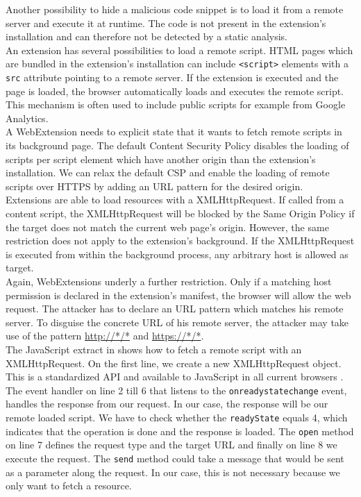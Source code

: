 			Another possibility to hide a malicious code snippet is to load it from a remote server and execute it at runtime. The code is not present in the extension's installation and can therefore not be detected by a static analysis. \\
		
			An extension has several possibilities to load a remote script. HTML pages which are bundled in the extension's installation can include \texttt{<script>} elements with a \texttt{src} attribute pointing to a remote server. If the extension is executed and the page is loaded, the browser automatically loads and executes the remote script. This mechanism is often used to include public scripts for example from Google Analytics. \\
			A WebExtension needs to explicit state that it wants to fetch remote scripts in its background page. The default Content Security Policy disables the loading of scripts per script element which have another origin than the extension's installation. We can relax the default CSP and enable the loading of remote scripts over HTTPS by adding an URL pattern for the desired origin. \\

			Extensions are able to load resources with a XMLHttpRequest. If called from a content script, the XMLHttpRequest will be blocked by the Same Origin Policy if the target does not match the current web page's origin. However, the same restriction does not apply to the extension's background. If the XMLHttpRequest is executed from within the background process, any arbitrary host is allowed as target. \\
			Again, WebExtensions underly a further restriction. Only if a matching host permission is declared in the extension's manifest, the browser will allow the web request. The attacker has to declare an URL pattern which matches his remote server. To disguise the concrete URL of his remote server, the attacker may take use of the pattern \url{http://*/*} and \url{https://*/*}. \\
			The JavaScript extract in  shows how to fetch a remote script with an XMLHttpRequest. On the first line, we create a new XMLHttpRequest object. This is a standardized API and available to JavaScript in all current browsers \cite{w3cXMLHttpRequest}. The event handler on line 2 till 6 that listens to the \texttt{onreadystatechange} event, handles the response from our request. In our case, the response will be our remote loaded script. We have to check whether the \texttt{readyState} equals 4, which indicates that the operation is done and the response is loaded. The \texttt{open} method on line 7 defines the request type and the target URL and finally on line 8 we execute the request. The \texttt{send} method could take a message that would be sent as a parameter along the request. In our case, this is not necessary because we only want to fetch a resource. 
			
